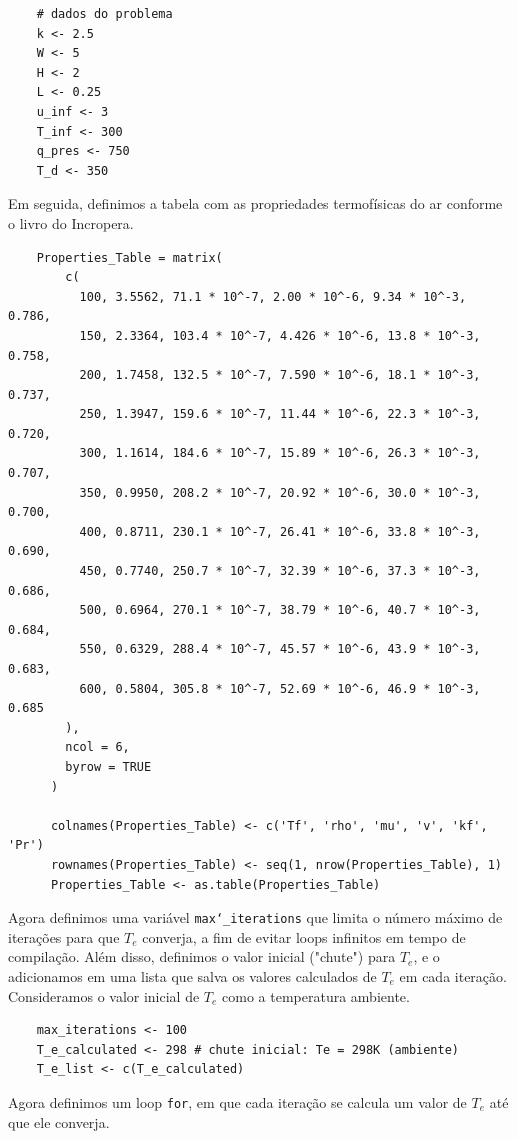 \documentclass[12pt]{scrartcl}
\newcommand{\code}[1]{\texttt{#1}}
\begin{document}
\begin{lstlisting}
    # dados do problema
    k <- 2.5
    W <- 5
    H <- 2
    L <- 0.25
    u_inf <- 3
    T_inf <- 300
    q_pres <- 750
    T_d <- 350
\end{lstlisting}

Em seguida, definimos a tabela com as propriedades termofísicas do ar conforme o livro
do Incropera. 

\begin{lstlisting}
    Properties_Table = matrix(
        c(
          100, 3.5562, 71.1 * 10^-7, 2.00 * 10^-6, 9.34 * 10^-3, 0.786,
          150, 2.3364, 103.4 * 10^-7, 4.426 * 10^-6, 13.8 * 10^-3, 0.758,
          200, 1.7458, 132.5 * 10^-7, 7.590 * 10^-6, 18.1 * 10^-3, 0.737,
          250, 1.3947, 159.6 * 10^-7, 11.44 * 10^-6, 22.3 * 10^-3, 0.720,
          300, 1.1614, 184.6 * 10^-7, 15.89 * 10^-6, 26.3 * 10^-3, 0.707,
          350, 0.9950, 208.2 * 10^-7, 20.92 * 10^-6, 30.0 * 10^-3, 0.700,
          400, 0.8711, 230.1 * 10^-7, 26.41 * 10^-6, 33.8 * 10^-3, 0.690,
          450, 0.7740, 250.7 * 10^-7, 32.39 * 10^-6, 37.3 * 10^-3, 0.686,
          500, 0.6964, 270.1 * 10^-7, 38.79 * 10^-6, 40.7 * 10^-3, 0.684,
          550, 0.6329, 288.4 * 10^-7, 45.57 * 10^-6, 43.9 * 10^-3, 0.683,
          600, 0.5804, 305.8 * 10^-7, 52.69 * 10^-6, 46.9 * 10^-3, 0.685
        ),
        ncol = 6,
        byrow = TRUE
      )
      
      colnames(Properties_Table) <- c('Tf', 'rho', 'mu', 'v', 'kf', 'Pr')
      rownames(Properties_Table) <- seq(1, nrow(Properties_Table), 1)
      Properties_Table <- as.table(Properties_Table)
\end{lstlisting}

Agora definimos uma variável \code{max\char`_iterations} que limita o número máximo de
iterações para que $T_e$ converja, a fim de evitar loops infinitos em tempo de compilação.
Além disso, definimos o valor inicial ("chute") para $T_e$, e o adicionamos em uma lista
que salva os valores calculados de $T_e$ em cada iteração. Consideramos o valor inicial de
$T_e$ como a temperatura ambiente.

\begin{lstlisting}
    max_iterations <- 100
    T_e_calculated <- 298 # chute inicial: Te = 298K (ambiente)
    T_e_list <- c(T_e_calculated)
\end{lstlisting}

Agora definimos um loop \code{for}, em que cada iteração se calcula um valor de $T_e$ até que ele converja.
\end{document}
